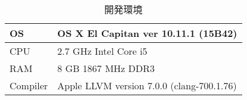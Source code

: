 \begin{table}[H]
    \centering
    \caption{開発環境}
    \label{devEnv}
    \begin{tabular}{|l|l|} \hline
        OS  & OS X El Capitan ver 10.11.1 (15B42) \\ \hline
        CPU & 2.7 GHz Intel Core i5 \\ \hline
        RAM & 8 GB 1867 MHz DDR3 \\ \hline
        Compiler & Apple LLVM version 7.0.0 (clang-700.1.76) \\ \hline
    \end{tabular}
\end{table}
